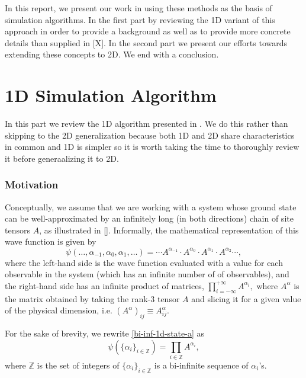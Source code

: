 \documentclass{article}
\newcommand{\Z}{\mathbb{Z}}
\begin{document}
In this report, we present our work in using these methods as the basis of simulation algorithms.  In the first part by reviewing the 1D variant of this approach in order to provide a background as well as to provide more concrete details than supplied in [X].  In the second part we present our efforts towards extending these concepts to 2D.  We end with a conclusion.

\part{1D Simulation Algorithm}
\label{1dsim}

In this part we review the 1D algorithm presented in \cite{Crosswhite2008}.  We do this rather than skipping to the 2D generalization because both 1D and 2D share characteristics in common and 1D is simpler so it is worth taking the time to thoroughly review it before generaalizing it to 2D.

\section{Motivation}

Conceptually, we assume that we are working with a system whose ground state can be well-approximated by an infinitely long (in both directions) chain of site tensors $A$, as illustrated in [].  Informally, the mathematical representation of this wave function is given by
\begin{equation}
\label{bi-inf-1d-state-a}
\psi(\dots,\alpha_{-1},\alpha_{0},\alpha_1,\dots)= \cdots A^{\alpha_{-1}} \cdot A^{\alpha_0}\cdot A^{\alpha_1}\cdot A^{\alpha_2} \cdots,
\end{equation}
where the left-hand side is the wave function evaluated with a value for each observable in the system (which has an infinite number of of observables), and the right-hand side has an infinite product of matrices, $\prod_{i=-\infty}^{+\infty} A^{\alpha_i},$ where $A^{\alpha}$ is the matrix obtained by taking the rank-3 tensor $A$ and slicing it for a given value of the physical dimension, i.e. $(A^\alpha)_{ij}\equiv A^\alpha_{ij}$.

For the sake of brevity, we rewrite \ref{bi-inf-1d-state-a} as
\begin{equation}
\label{bi-inf-1d-state-b}
\psi(\{\alpha_i\}_{i\in\Z}) = \prod_{i\in\Z} A^{\alpha_i},
\end{equation}
where $\Z$ is the set of integers of $\{\alpha_i\}_{i\in\Z}$ is a bi-infinite sequence of $\alpha_i$'s.
\end{document}
